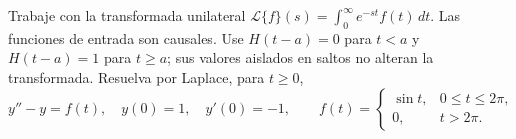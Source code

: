 Trabaje con la transformada unilateral $\mathcal L\{f\}(s)=\int_0^\infty e^{-st}f(t)\,dt$. Las funciones de entrada son causales. Use $H(t-a)=0$ para $t<a$ y $H(t-a)=1$ para $t\ge a$; sus valores aislados en saltos no alteran la transformada. Resuelva por Laplace, para $t\ge0$,
\[y''-y=f(t),\quad y(0)=1,\quad y'(0)=-1,\qquad f(t)=\begin{cases}\sin t,&0\le t\le2\pi,\\0,&t>2\pi.\end{cases}\]
